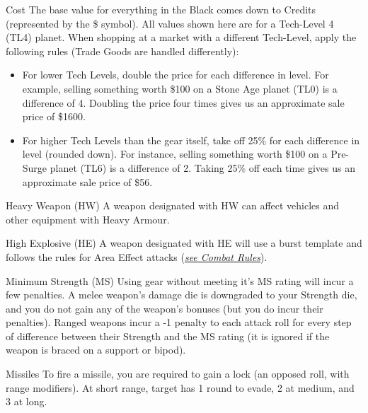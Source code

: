 \begin{multicols}{2}
\begin{genericsection}{Cost}
The base value for everything in the Black comes down to Credits (represented by the \$ symbol). All values shown here are for a Tech-Level 4 (TL4) planet. When shopping at a market with a different Tech-Level, apply the following rules (Trade Goods are handled differently):
\begin{itemize}
  \item For lower Tech Levels, double the price for each difference in level. For example, selling something worth \$100 on a Stone Age planet (TL0) is a difference of 4. Doubling the price four times gives us an approximate sale price of \$1600.

  \item For higher Tech Levels than the gear itself, take off 25\% for each difference in level (rounded down). For instance, selling something worth \$100 on a Pre-Surge planet (TL6) is a difference of 2. Taking 25\% off each time gives us an approximate sale price of \$56.
\end{itemize}
\end{genericsection}

\begin{genericsection}{Heavy Weapon (HW)}
A weapon designated with HW can affect vehicles and other equipment with Heavy Armour.
\end{genericsection}

\begin{genericsection}{High Explosive (HE)}
A weapon designated with HE will use a burst template and follows the rules for Area Effect attacks (\textit{\hyperref[sec:rules-combat]{see Combat Rules}}).
\end{genericsection}

\begin{genericsection}{Minimum Strength (MS)}
Using gear without meeting it's MS rating will incur a few penalties. A melee weapon's damage die is downgraded to your Strength die, and you do not gain any of the weapon's bonuses (but you do incur their penalties). Ranged weapons incur a -1 penalty to each attack roll for every step of difference between their Strength and the MS rating (it is ignored if the weapon is braced on a support or bipod).
\end{genericsection}

\begin{genericsection}{Missiles}
To fire a missile, you are required to gain a lock (an opposed roll, with range modifiers). At short range, target has 1 round to evade, 2 at medium, and 3 at long.
\end{genericsection}


\end{multicols}
